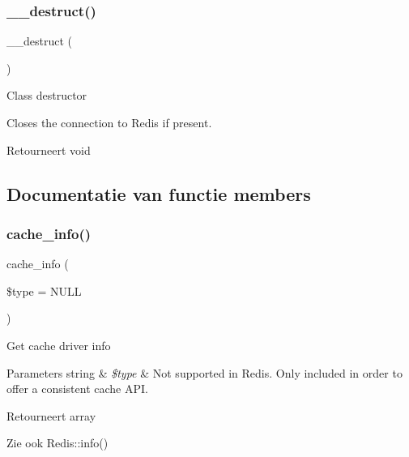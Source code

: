 \subsubsection{\texorpdfstring{\_\_destruct()}{\_\_destruct()}}
{\footnotesize\ttfamily \+\_\+\+\_\+destruct (\begin{DoxyParamCaption}{ }\end{DoxyParamCaption})}

Class destructor

Closes the connection to Redis if present.

\begin{DoxyReturn}{Retourneert}
void 
\end{DoxyReturn}


\subsection{Documentatie van functie members}
\mbox{\label{class_c_i___cache__redis_aa8b9c4d9f0387156736ccd8850f0727e}} 
\subsubsection{\texorpdfstring{cache\_info()}{cache\_info()}}
{\footnotesize\ttfamily cache\+\_\+info (\begin{DoxyParamCaption}\item[{}]{\$type = {\ttfamily NULL} }\end{DoxyParamCaption})}

Get cache driver info


\begin{DoxyParams}[1]{Parameters}
string & {\em \$type} & Not supported in Redis. Only included in order to offer a consistent cache A\+PI. \\
\hline
\end{DoxyParams}
\begin{DoxyReturn}{Retourneert}
array 
\end{DoxyReturn}
\begin{DoxySeeAlso}{Zie ook}
Redis\+::info() 
\end{DoxySeeAlso}
\mbox{\label{class_c_i___cache__redis_adb40b812890a8bc058bf6b7a0e1a54d9}} 
